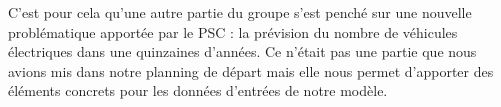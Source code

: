 	C'est pour cela qu'une autre partie du groupe s'est penché sur une nouvelle problématique apportée par le PSC : la prévision du nombre de véhicules électriques dans une quinzaines d'années. Ce n'était pas une partie que nous avions mis dans notre planning de départ mais elle nous permet d'apporter des éléments concrets pour les données d'entrées de notre modèle.
	